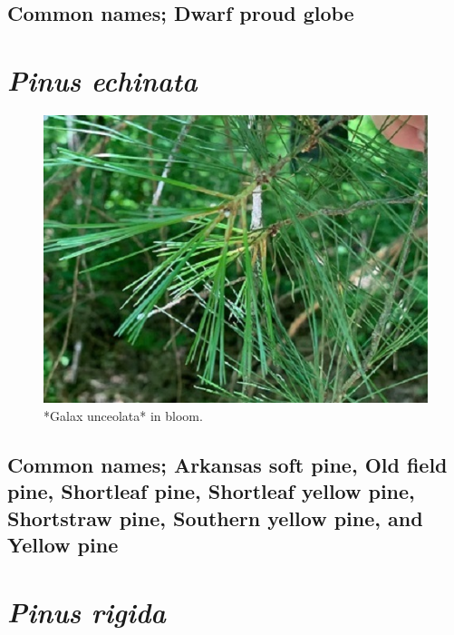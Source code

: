 \documentclass[
]{article}
\begin{document}
\hypertarget{common-names-dwarf-proud-globe}{%
\subsection{Common names; Dwarf proud globe}\label{common-names-dwarf-proud-globe}}

\hypertarget{pinus-echinata}{%
\section{\texorpdfstring{\emph{Pinus echinata}}{Pinus echinata}}\label{pinus-echinata}}

\begin{figure}

{\centering \includegraphics[width=0.5\linewidth]{shortpine} 

}

\caption{*Galax unceolata* in bloom.}\label{fig:shpine}
\end{figure}

\hypertarget{common-names-arkansas-soft-pine-old-field-pine-shortleaf-pine-shortleaf-yellow-pine-shortstraw-pine-southern-yellow-pine-and-yellow-pine}{%
\subsection{Common names; Arkansas soft pine, Old field pine, Shortleaf pine, Shortleaf yellow pine, Shortstraw pine, Southern yellow pine, and Yellow pine}\label{common-names-arkansas-soft-pine-old-field-pine-shortleaf-pine-shortleaf-yellow-pine-shortstraw-pine-southern-yellow-pine-and-yellow-pine}}

\hypertarget{pinus-rigida}{%
\section{\texorpdfstring{\emph{Pinus rigida}}{Pinus rigida}}\label{pinus-rigida}}
\end{document}
